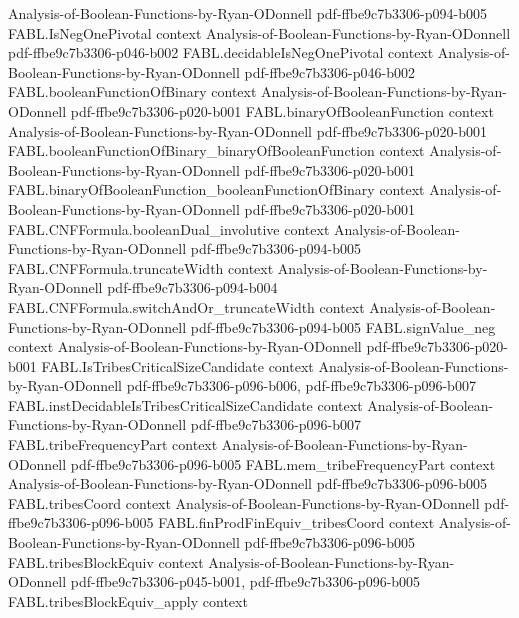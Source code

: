 \begin{theorem}
  {Analysis-of-Boolean-Functions-by-Ryan-ODonnell}
  {pdf-ffbe9c7b3306-p094-b005}
\proofstep
  {FABL.IsNegOnePivotal}
  {context}
  {Analysis-of-Boolean-Functions-by-Ryan-ODonnell}
  {pdf-ffbe9c7b3306-p046-b002}
\proofstep
  {FABL.decidableIsNegOnePivotal}
  {context}
  {Analysis-of-Boolean-Functions-by-Ryan-ODonnell}
  {pdf-ffbe9c7b3306-p046-b002}
\proofstep
  {FABL.booleanFunctionOfBinary}
  {context}
  {Analysis-of-Boolean-Functions-by-Ryan-ODonnell}
  {pdf-ffbe9c7b3306-p020-b001}
\proofstep
  {FABL.binaryOfBooleanFunction}
  {context}
  {Analysis-of-Boolean-Functions-by-Ryan-ODonnell}
  {pdf-ffbe9c7b3306-p020-b001}
\proofstep
  {FABL.booleanFunctionOfBinary_binaryOfBooleanFunction}
  {context}
  {Analysis-of-Boolean-Functions-by-Ryan-ODonnell}
  {pdf-ffbe9c7b3306-p020-b001}
\proofstep
  {FABL.binaryOfBooleanFunction_booleanFunctionOfBinary}
  {context}
  {Analysis-of-Boolean-Functions-by-Ryan-ODonnell}
  {pdf-ffbe9c7b3306-p020-b001}
\proofstep
  {FABL.CNFFormula.booleanDual_involutive}
  {context}
  {Analysis-of-Boolean-Functions-by-Ryan-ODonnell}
  {pdf-ffbe9c7b3306-p094-b005}
\proofstep
  {FABL.CNFFormula.truncateWidth}
  {context}
  {Analysis-of-Boolean-Functions-by-Ryan-ODonnell}
  {pdf-ffbe9c7b3306-p094-b004}
\proofstep
  {FABL.CNFFormula.switchAndOr_truncateWidth}
  {context}
  {Analysis-of-Boolean-Functions-by-Ryan-ODonnell}
  {pdf-ffbe9c7b3306-p094-b005}
\proofstep
  {FABL.signValue_neg}
  {context}
  {Analysis-of-Boolean-Functions-by-Ryan-ODonnell}
  {pdf-ffbe9c7b3306-p020-b001}
\proofstep
  {FABL.IsTribesCriticalSizeCandidate}
  {context}
  {Analysis-of-Boolean-Functions-by-Ryan-ODonnell}
  {pdf-ffbe9c7b3306-p096-b006,
    pdf-ffbe9c7b3306-p096-b007}
\proofstep
  {FABL.instDecidableIsTribesCriticalSizeCandidate}
  {context}
  {Analysis-of-Boolean-Functions-by-Ryan-ODonnell}
  {pdf-ffbe9c7b3306-p096-b007}
\proofstep
  {FABL.tribeFrequencyPart}
  {context}
  {Analysis-of-Boolean-Functions-by-Ryan-ODonnell}
  {pdf-ffbe9c7b3306-p096-b005}
\proofstep
  {FABL.mem_tribeFrequencyPart}
  {context}
  {Analysis-of-Boolean-Functions-by-Ryan-ODonnell}
  {pdf-ffbe9c7b3306-p096-b005}
\proofstep
  {FABL.tribesCoord}
  {context}
  {Analysis-of-Boolean-Functions-by-Ryan-ODonnell}
  {pdf-ffbe9c7b3306-p096-b005}
\proofstep
  {FABL.finProdFinEquiv_tribesCoord}
  {context}
  {Analysis-of-Boolean-Functions-by-Ryan-ODonnell}
  {pdf-ffbe9c7b3306-p096-b005}
\proofstep
  {FABL.tribesBlockEquiv}
  {context}
  {Analysis-of-Boolean-Functions-by-Ryan-ODonnell}
  {pdf-ffbe9c7b3306-p045-b001,
    pdf-ffbe9c7b3306-p096-b005}
\proofstep
  {FABL.tribesBlockEquiv_apply}
  {context}

\end{theorem}
